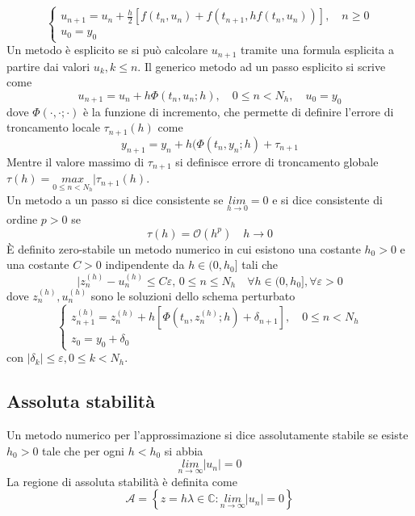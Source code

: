 \documentclass[a4paper,12pt]{article}
\begin{document}
$$
\begin{cases}
u_{n+1} = u_n + \frac{h}{2}[f(t_n, u_n)+f(t_{n+1}, hf(t_n, u_n))], \quad n\geq 0 \\
u_0 = y_0
\end{cases}
$$
Un metodo è esplicito se si può calcolare $u_{n+1}$ tramite una formula esplicita a partire dai valori $u_k, k\leq n$. Il generico metodo ad un passo esplicito si scrive come 
$$
u_{n+1} = u_n + h\Phi(t_n, u_n; h), \quad 0 \leq n < N_h, \quad u_0 = y_0
$$
dove $\Phi(\cdot,\cdot;\cdot)$ è la funzione di incremento, che permette di definire l'errore di troncamento locale $\tau_{n+1}(h)$ come
$$
y_{n+1} = y_n + h(\Phi(t_n, y_n;h) + \tau_{n+1}
$$
Mentre il valore massimo di $\tau_{n+1}$ si definisce errore di troncamento globale $\tau(h) = \underset{0 \leq n <N_h}{max} |\tau_{n+1}(h)$. \\
Un metodo a un passo si dice consistente se $\underset{h \rightarrow 0}{lim} = 0$ e si dice consistente di ordine $p > 0$ se 
$$
\tau(h) = \mathcal{O}(h^p) \quad h \rightarrow 0
$$
È definito zero-stabile un metodo numerico in cui esistono una costante $h_0 > 0$ e una costante $C >0$ indipendente da $h \in (0, h_0]$ tali che
$$
|z_n^{(h)} - u_n^{(h)} \leq C\varepsilon, \, 0 \leq n \leq N_h \quad \forall h \in (0, h_0], \forall \varepsilon >0
$$
dove $z_n^{(h)}, u_n^{(h)}$ sono le soluzioni dello schema perturbato
$$
\begin{cases}
z_{n+1}^{(h)} = z_n^{(h)} + h[\Phi (t_n, z_n^{(h)}; h) + \delta_{n+1}], \quad 0 \leq n < N_h \\
z_0 = y_0 + \delta_0
\end{cases}
$$
con $|\delta_k| \leq \varepsilon, 0 \leq k < N_h$.
\subsection{Assoluta stabilità}
Un metodo numerico per l'approssimazione si dice assolutamente stabile se esiste $h_0 > 0$ tale che per ogni $h <h_0$ si abbia
$$
\underset{n \rightarrow \infty}{lim} |u_n| = 0
$$
La regione di assoluta stabilità è definita come 
$$
\mathcal{A} = \left\lbrace z = h\lambda \in \mathbb{C} : \underset{n \rightarrow \infty}{lim} |u_n| =0 \right\rbrace
$$
\end{document}
